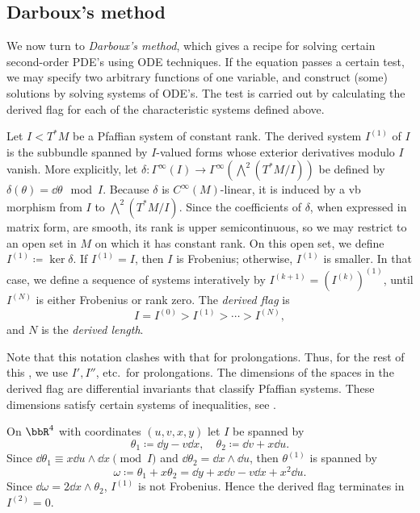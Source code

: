 \subsection{Darboux's method}

We now turn to \emph{Darboux's method}, which gives a recipe for solving certain second-order PDE's using ODE techniques. If the equation passes a certain test, we may specify two arbitrary functions of one variable, and construct (some) solutions by solving systems of ODE's. The test is carried out by calculating the derived flag for each of the characteristic systems defined above.


\begin{defn}
    Let $I<T^\ast M$ be a Pfaffian system of constant rank. The derived system $I^{(1)}$ of $I$ is the subbundle spanned by $I$-valued forms whose exterior derivatives modulo $I$ vanish. More explicitly, let $\delta:\Gamma^\infty(I)\to \Gamma^\infty\left(\bigwedge^2(T^\ast M\slash I)\right)$ be defined by $\delta(\theta)=\dd\theta\mod I$. Because $\delta$ is $C^\infty(M)$-linear, it is induced by a \gls{vb} morphism from $I$ to $\bigwedge^2(T^\ast M\slash I)$. Since the coefficients of $\delta$, when expressed in matrix form, are smooth, its rank is upper semicontinuous, so we may restrict to an open set in $M$ on which it has constant rank. On this open set, we define $I^{(1)}\coloneqq \ker\delta$. If $I^{(1)}=I$, then $I$ is Frobenius; otherwise, $I^{(1)}$ is smaller. In that case, we define a sequence of systems interatively by $I^{(k+1)}=(I^{(k)})^{(1)}$, until $I^{(N)}$ is either Frobenius or rank zero. The \emph{derived flag} is 
    \[I=I^{(0)}> I^{(1)}>\cdots >I^{(N)},\]
    and $N$ is the \emph{derived length}.
\end{defn}

Note that this notation clashes with that for prolongations. Thus, for the rest of this \subsect, we use $I',I''$, etc.\ for prolongations. The dimensions of the spaces in the derived flag are differential invariants that classify Pfaffian systems. These dimensions satisfy certain systems of inequalities, see \cite{Bryant}.

\begin{example}
    On $\bbR^4$ with coordinates $(u,v,x,y)$ let $I$ be spanned by 
    \[\theta_1\coloneqq \dd y-v\dd x,\quad \theta_2\coloneqq \dd v+x\dd u.\]
    Since $\dd\theta_1\equiv x\dd u\wedge \dd x\pmod{I}$ and $\dd\theta_2=\dd x\wedge\dd u$, then $\theta^{(1)}$ is spanned by 
    \[\omega\coloneqq \theta_1+x\theta_2=\dd y+x\dd v-v \dd x+x^2\dd u.\]
    Since $\dd\omega=2\dd x\wedge\theta_2$, $I^{(1)}$ is not Frobenius. Hence the derived flag terminates in $I^{(2)}=0$.
\end{example}



